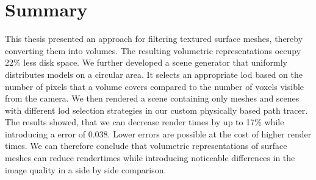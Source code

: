 \chapter{Summary}
\label{chap:summary}
This thesis presented an approach for filtering textured surface meshes, thereby converting them into volumes.
The resulting volumetric representations occupy 22\% less disk space.
We further developed a scene generator that uniformly distributes models on a circular area.
It selects an appropriate \ac{lod} based on the number of pixels that a volume covers compared to the number of voxels visible from the camera.
We then rendered a scene containing only meshes and scenes with different \ac{lod} selection strategies in our custom physically based path tracer.
The results showed, that we can decrease render times by up to 17\% while introducing a \FLIP error of 0.038.
Lower \FLIP errors are possible at the cost of higher render times.
We can therefore conclude that volumetric representations of surface meshes can reduce rendertimes while introducing noticeable differences in the image quality in a side by side comparison.